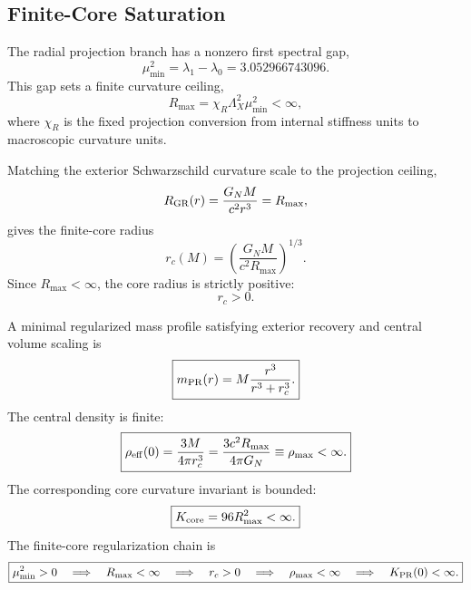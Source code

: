 \documentclass[11pt]{article}
\begin{document}
\subsection{Finite-Core Saturation}

The radial projection branch has a nonzero first spectral gap,
\begin{equation}
\boxed{
\mu_{\min}^2
=
\lambda_1-\lambda_0
=
3.052966743096.
}
\end{equation}
This gap sets a finite curvature ceiling,
\begin{equation}
\boxed{
R_{\max}
=
\chi_R\Lambda_X^2\mu_{\min}^2
<
\infty,
}
\end{equation}
where \(\chi_R\) is the fixed projection conversion from internal stiffness units
to macroscopic curvature units.

Matching the exterior Schwarzschild curvature scale to the projection ceiling,
\begin{equation}
R_{\rm GR}(r)
=
\frac{G_NM}{c^2r^3}
=
R_{\max},
\end{equation}
gives the finite-core radius
\begin{equation}
\boxed{
r_c(M)
=
\left(
\frac{G_NM}{c^2R_{\max}}
\right)^{1/3}.
}
\end{equation}
Since \(R_{\max}<\infty\), the core radius is strictly positive:
\begin{equation}
\boxed{
r_c>0.
}
\end{equation}

A minimal regularized mass profile satisfying exterior recovery and central
volume scaling is
\begin{equation}
\boxed{
m_{\rm PR}(r)
=
M
\frac{r^3}{r^3+r_c^3}.
}
\end{equation}
The central density is finite:
\begin{equation}
\boxed{
\rho_{\rm eff}(0)
=
\frac{3M}{4\pi r_c^3}
=
\frac{3c^2R_{\max}}{4\pi G_N}
\equiv
\rho_{\max}
<
\infty.
}
\end{equation}
The corresponding core curvature invariant is bounded:
\begin{equation}
\boxed{
K_{\rm core}
=
96R_{\max}^2
<
\infty.
}
\end{equation}
The finite-core regularization chain is
\begin{equation}
\boxed{
\mu_{\min}^2>0
\quad\Longrightarrow\quad
R_{\max}<\infty
\quad\Longrightarrow\quad
r_c>0
\quad\Longrightarrow\quad
\rho_{\max}<\infty
\quad\Longrightarrow\quad
K_{\rm PR}(0)<\infty.
}
\end{equation}
\end{document}
